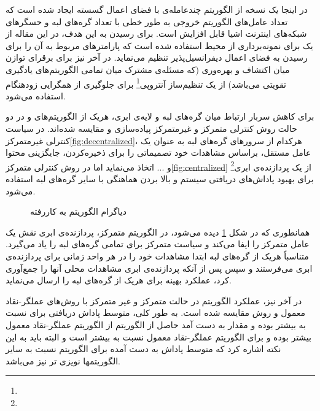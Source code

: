 در اینجا یک نسخه از الگوریتم چندعامله‌ی  با فضای اعمال گسسته ایجاد شده است که تعداد عامل‌های الگوریتم خروجی به طور خطی با تعداد گره‌های لبه و حسگرهای شبکه‌های اینترنت اشیا قابل افزایش است. برای رسیدن به این هدف، در این مقاله از یک  برای نمونه‌برداری از محیط استفاده شده است که پارامترهای مربوط به آن را برای رسیدن به فضای اعمال دیفرانسیل‌پذیر تنظیم می‌نماید. در آخر نیز برای برقرای توازن میان اکتشاف و بهره‌وری (که مسئله‌ی مشترک میان تمامی الگوریتم‌های یادگیری تقویتی می‌باشد) از یک تنظیم‌ساز آنتروپی\footnote{} برای جلوگیری از همگرایی زودهنگام استفاده می‌شود.

برای کاهش سربار ارتباط میان گره‌های لبه و لایه‌ی ابری، هریک از الگوریتم‌های  و  در دو حالت روش کنترلی متمرکز و غیرمتمرکز پیاده‌سازی و مقایسه شده‌اند. در سیاست کنترلی غیرمتمرکز\ref{fig:decentralized}، هرکدام از سرورهای گره‌های لبه به عنوان یک عامل مستقل، براساس مشاهدات خود تصمیماتی را برای ذخیره‌کردن، جایگزینی محتوا و ... اتخاذ می‌نماید اما در روش کنترلی متمرکز\ref{fig:centralized} از یک پردازنده‌ی ابری\footnote{} برای بهبود پاداش‌های دریافتی سیستم و بالا بردن هماهنگی با سایر گره‌های لبه استفاده می‌شود.

\begin{figure}[ht]
	\centering 
	\hspace{10mm}
	\caption{دیاگرام الگوریتم  به کاررفته}
	\label{fig:centralizedvsdec} %
\end{figure}
\pagebreak

همانطوری که در شکل \ref{fig:centralizedvsdec} دیده می‌شود، در الگوریتم متمرکز، پردازنده‌ی ابری نقش یک عامل متمرکز را ایفا می‌کند و سیاست متمرکز برای تمامی گره‌های لبه را یاد می‌گیرد. متناسباً هریک از گره‌های لبه ابتدا مشاهدات خود را در هر واحد زمانی برای پردازنده‌ی ابری می‌فرستند و سپس پس از آنکه پردازنده‌ی ابری مشاهدات محلی آنها را جمع‌آوری کرد، عملکرد بهینه برای هریک از گره‌های لبه را ارسال می‌نماید. 

در آخر نیز، عملکرد الگوریتم  در حالت متمرکز و غیر متمرکز با روش‌های عملگر-نقاد معمول و روش  مقایسه شده است. به طور کلی، متوسط پاداش دریافتی برای  نسبت به  بیشتر بوده و مقدار به دست آمد حاصل از الگوریتم  از الگوریتم عملگر-نقاد معمول بیشتر بوده و برای الگوریتم عملگر-نقاد معمول نسبت به  بیشتر است و البته باید به این نکته اشاره کرد که متوسط پاداش به دست آمده برای الگوریتم  نسبت به سایر الگوریتمها نویزی تر نیز می‌باشد. 


